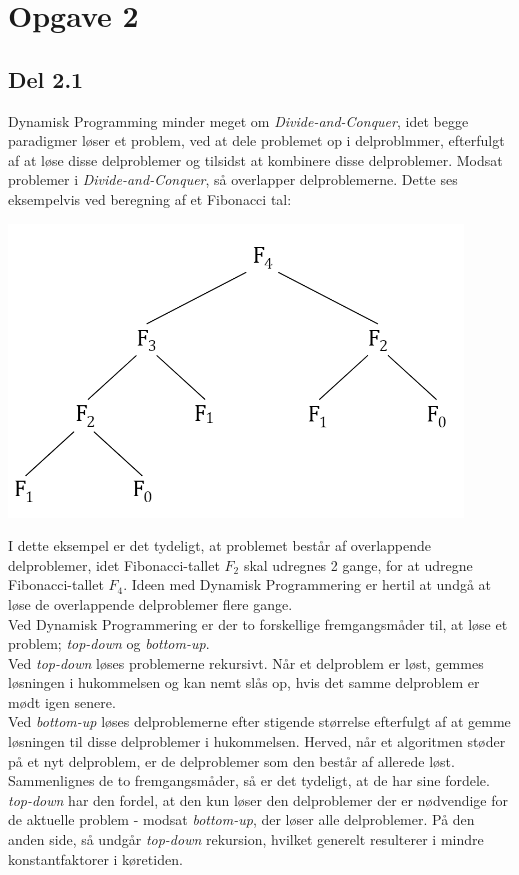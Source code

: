 \documentclass{report}
\begin{document}
\newpage


\section*{Opgave 2}
\subsection*{Del 2.1}
Dynamisk Programming minder meget om \textit{Divide-and-Conquer}, idet begge paradigmer løser et problem, ved at dele problemet op i delproblmmer, efterfulgt af at løse disse delproblemer og tilsidst at kombinere disse delproblemer. Modsat problemer i \textit{Divide-and-Conquer}, så overlapper delproblemerne. Dette ses eksempelvis ved beregning af et Fibonacci tal:
\begin{center}
    \includegraphics[height = 4 cm]{../entities/DP_fibonacci.PNG}
\end{center}
I dette eksempel er det tydeligt, at problemet består af overlappende delproblemer, idet Fibonacci-tallet $F_2$ skal udregnes 2 gange, for at udregne Fibonacci-tallet $F_4$. Ideen med Dynamisk Programmering er hertil at undgå at løse de overlappende delproblemer flere gange. \\
Ved Dynamisk Programmering er der to forskellige fremgangsmåder til, at løse et problem; \textit{top-down} og \textit{bottom-up}. \\
Ved \textit{top-down} løses problemerne rekursivt. Når et delproblem er løst, gemmes løsningen i hukommelsen og kan nemt slås op, hvis det samme delproblem er mødt igen senere. \\
Ved \textit{bottom-up} løses delproblemerne efter stigende størrelse efterfulgt af at gemme løsningen til disse delproblemer i hukommelsen. Herved, når et algoritmen støder på et nyt delproblem, er de delproblemer som den består af allerede løst. \\
Sammenlignes de to fremgangsmåder, så er det tydeligt, at de har sine fordele. \textit{top-down} har den fordel, at den kun løser den delproblemer der er nødvendige for de aktuelle problem - modsat \textit{bottom-up}, der løser alle delproblemer. På den anden side, så undgår \textit{top-down} rekursion, hvilket generelt resulterer i mindre konstantfaktorer i køretiden.
\end{document}

